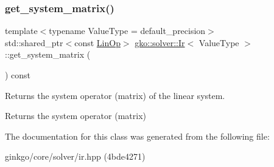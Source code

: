 \subsubsection{\texorpdfstring{get\+\_\+system\+\_\+matrix()}{get\_system\_matrix()}}
{\footnotesize\ttfamily template$<$typename Value\+Type  = default\+\_\+precision$>$ \\
std\+::shared\+\_\+ptr$<$const \hyperlink{classgko_1_1LinOp}{Lin\+Op}$>$ \hyperlink{classgko_1_1solver_1_1Ir}{gko\+::solver\+::\+Ir}$<$ Value\+Type $>$\+::get\+\_\+system\+\_\+matrix (\begin{DoxyParamCaption}{ }\end{DoxyParamCaption}) const}



Returns the system operator (matrix) of the linear system. 

\begin{DoxyReturn}{Returns}
the system operator (matrix) 
\end{DoxyReturn}


The documentation for this class was generated from the following file\+:\begin{DoxyCompactItemize}
\item 
ginkgo/core/solver/ir.\+hpp (4bde4271)\end{DoxyCompactItemize}
